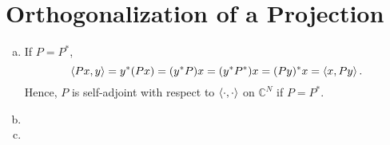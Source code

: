 \section{Orthogonalization of a Projection}\label{sec:part3}

\begin{enumerate}[(a)]
\item If $P = P^*$,
\[\left\langle Px, y \right\rangle = y^* (Px) = (y^*P)x = (y^*P^*)x = (Py)^*x = \left\langle x, Py \right\rangle.\]
Hence, $P$ is self-adjoint with respect to $\left\langle \cdot, \cdot \right\rangle$ on $\mathbb{C}^N$ if $P = P^*$.

\item

\item
\end{enumerate}